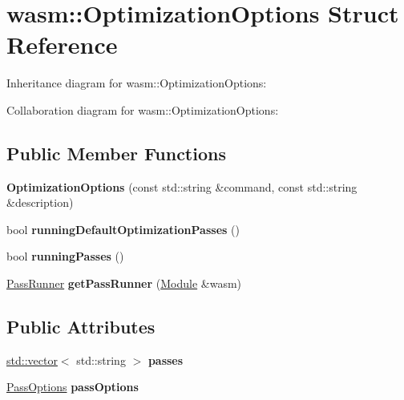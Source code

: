 \hypertarget{structwasm_1_1_optimization_options}{}\section{wasm\+:\+:Optimization\+Options Struct Reference}
\label{structwasm_1_1_optimization_options}


Inheritance diagram for wasm\+:\+:Optimization\+Options\+:


Collaboration diagram for wasm\+:\+:Optimization\+Options\+:
\subsection*{Public Member Functions}
\begin{DoxyCompactItemize}
\item 
\mbox{\label{structwasm_1_1_optimization_options_a47754f9425c81ca447fb7a71fa713b3f}} 
{\bfseries Optimization\+Options} (const std\+::string \&command, const std\+::string \&description)
\item 
\mbox{\label{structwasm_1_1_optimization_options_a0948c2fc978173c0ccfd647761819e6c}} 
bool {\bfseries running\+Default\+Optimization\+Passes} ()
\item 
\mbox{\label{structwasm_1_1_optimization_options_a1807dd50bfe949c0738f0c6384ef4b77}} 
bool {\bfseries running\+Passes} ()
\item 
\mbox{\label{structwasm_1_1_optimization_options_a8208dbe591d99a388c43747165c07ac0}} 
\mbox{\hyperlink{structwasm_1_1_pass_runner}{Pass\+Runner}} {\bfseries get\+Pass\+Runner} (\mbox{\hyperlink{classwasm_1_1_module}{Module}} \&wasm)
\end{DoxyCompactItemize}
\subsection*{Public Attributes}
\begin{DoxyCompactItemize}
\item 
\mbox{\label{structwasm_1_1_optimization_options_ae5fd4acf536c41b646515f7c60dca203}} 
\mbox{\hyperlink{classstd_1_1vector}{std\+::vector}}$<$ std\+::string $>$ {\bfseries passes}
\item 
\mbox{\label{structwasm_1_1_optimization_options_a00620e9ba32d2a7c4fef93aa45bce8d6}} 
\mbox{\hyperlink{structwasm_1_1_pass_options}{Pass\+Options}} {\bfseries pass\+Options}
\end{DoxyCompactItemize}

